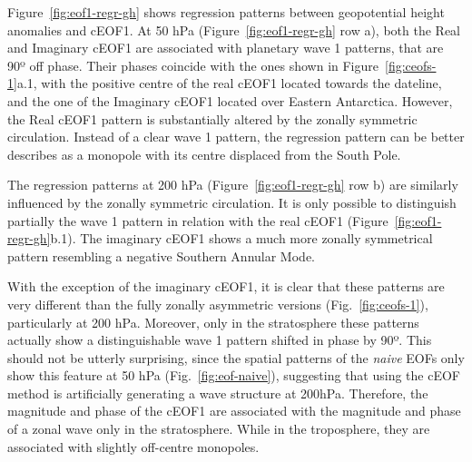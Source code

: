 \documentclass[smallextended]{svjour3}       %
\begin{document}
Figure~\ref{fig:eof1-regr-gh} shows regression patterns between geopotential height anomalies and cEOF1. At 50 hPa (Figure~\ref{fig:eof1-regr-gh} row a), both the Real and Imaginary cEOF1 are associated with planetary wave 1 patterns, that are 90º off phase. Their phases coincide with the ones shown in Figure~\ref{fig:ceofs-1}a.1, with the positive centre of the real cEOF1 located towards the dateline, and the one of the Imaginary cEOF1 located over Eastern Antarctica. However, the Real cEOF1 pattern is substantially altered by the zonally symmetric circulation. Instead of a clear wave 1 pattern, the regression pattern can be better describes as a monopole with its centre displaced from the South Pole.

The regression patterns at 200 hPa (Figure~\ref{fig:eof1-regr-gh} row b) are similarly influenced by the zonally symmetric circulation. It is only possible to distinguish partially the wave 1 pattern in relation with the real cEOF1 (Figure~\ref{fig:eof1-regr-gh}b.1). The imaginary cEOF1 shows a much more zonally symmetrical pattern resembling a negative Southern Annular Mode.

With the exception of the imaginary cEOF1, it is clear that these patterns are very different than the fully zonally asymmetric versions (Fig.~\ref{fig:ceofs-1}), particularly at 200 hPa. Moreover, only in the stratosphere these patterns actually show a distinguishable wave 1 pattern shifted in phase by 90º. This should not be utterly surprising, since the spatial patterns of the \emph{naive} EOFs only show this feature at 50 hPa (Fig.~\ref{fig:eof-naive}), suggesting that using the cEOF method is artificially generating a wave structure at 200hPa. Therefore, the magnitude and phase of the cEOF1 are associated with the magnitude and phase of a zonal wave only in the stratosphere. While in the troposphere, they are associated with slightly off-centre monopoles.
\end{document}
